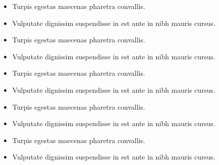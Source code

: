 




\begin{itemize}
  \item Turpis egestas maecenas pharetra convallis.
  \item Vulputate dignissim suspendisse in est ante in nibh mauris cursus.
\end{itemize}
\divider\small

\begin{itemize}
  \item Turpis egestas maecenas pharetra convallis.
  \item Vulputate dignissim suspendisse in est ante in nibh mauris cursus.
\end{itemize}
\divider\small

\begin{itemize}
  \item Turpis egestas maecenas pharetra convallis.
  \item Vulputate dignissim suspendisse in est ante in nibh mauris cursus.
\end{itemize}
\divider\small

\begin{itemize}
  \item Turpis egestas maecenas pharetra convallis.
  \item Vulputate dignissim suspendisse in est ante in nibh mauris cursus.
\end{itemize}
\divider\small

\begin{itemize}
  \item Turpis egestas maecenas pharetra convallis.
  \item Vulputate dignissim suspendisse in est ante in nibh mauris cursus.
\end{itemize}

